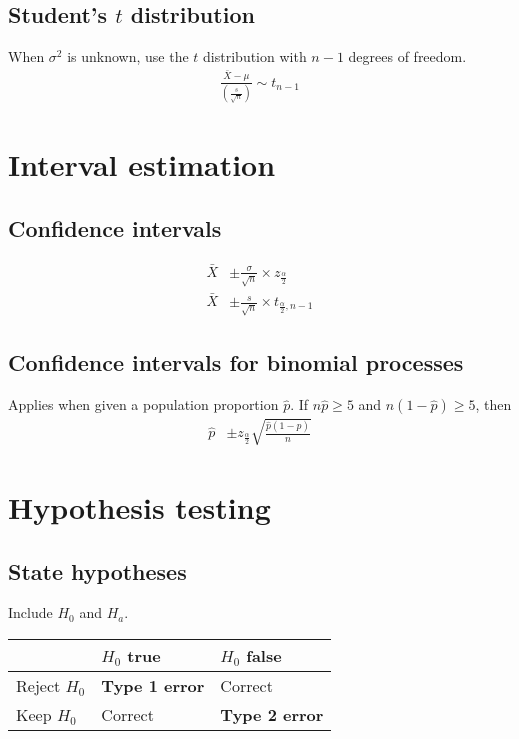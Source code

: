 \documentclass{article}
\newcommand{\soft}[1]{\left( #1 \right)}
\begin{document}
\begin{multicols*}{2}
\subsection{Student's $t$ distribution}
When $\sigma^2$ is unknown, use the $t$ distribution with $n - 1$ degrees of freedom.
\begin{align*}
    \frac{\bar{X} - \mu}{\soft{\frac{s}{\sqrt{n}}}} \sim t_{n - 1}
\end{align*}

\section{Interval estimation}

\subsection{Confidence intervals}
\begin{align*}
    \bar{X} &\pm \frac{\sigma}{\sqrt{n}} \times z_{\frac{\alpha}{2}} \\
    \bar{X} &\pm \frac{s}{\sqrt{n}} \times t_{\frac{\alpha}{2}, n - 1}
\end{align*}

\subsection{Confidence intervals for binomial processes}
Applies when given a population proportion $\hat{p}$. If $n\hat{p} \geq 5$ and $n(1 - \hat{p}) \geq 5$, then
\begin{align*}
    \hat{p} &\pm z_{\frac{\alpha}{2}} \sqrt{\frac{\hat{p} (1 - \hat{p})}{n}}
\end{align*}

\section{Hypothesis testing}

\subsection{State hypotheses}
Include $H_0$ and $H_a$.
\begin{center}
    \begin{tabular}{|l|l|l|}
        \hline
                     & $H_0$ true            & $H_0$ false           \\ \hline
        Reject $H_0$ & \textbf{Type 1 error} & Correct               \\ \hline
        Keep $H_0$   & Correct               & \textbf{Type 2 error} \\ \hline
    \end{tabular}
\end{center}


\end{multicols*}
\end{document}
